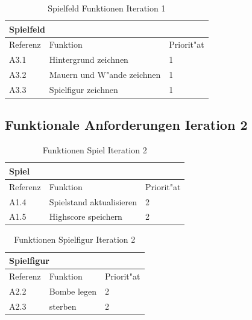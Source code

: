 \begin{table}[H]
  \begin{center}
    \begin{tabular}{|p{20mm}|p{85mm}|p{20mm}|}
    \multicolumn{3}{l}{\textbf{Spielfeld}} \\
    \hline Referenz & Funktion & Priorit"at \\
    \hline A3.1 & Hintergrund zeichnen & 1 \\
    \hline A3.2 & Mauern und W"ande zeichnen & 1 \\
    \hline A3.3 & Spielfigur zeichnen & 1 \\
    \hline
    \end{tabular}
  \end{center}
  \caption{Spielfeld Funktionen Iteration 1}
\end{table}


\subsection{Funktionale Anforderungen Ieration 2}


\begin{table}[H]
  \begin{center}
    \begin{tabular}{|p{20mm}|p{85mm}|p{20mm}|}
    \multicolumn{3}{l}{\textbf{Spiel}} \\
    \hline Referenz & Funktion & Priorit"at \\
    \hline A1.4 & Spielstand aktualisieren & 2 \\
    \hline A1.5 & Highscore speichern & 2 \\
    \hline
    \end{tabular}
  \end{center}
  \caption{Funktionen Spiel Iteration 2}
\end{table}



\begin{table}[H]
  \begin{center}
    \begin{tabular}{|p{20mm}|p{85mm}|p{20mm}|}
    \multicolumn{3}{l}{\textbf{Spielfigur}} \\
    \hline Referenz & Funktion & Priorit"at \\
    \hline A2.2 & Bombe legen  & 2 \\
    \hline A2.3 & sterben      & 2 \\
    \hline
    \end{tabular}
  \end{center}
  \caption{Funktionen Spielfigur Iteration 2}
\end{table}




